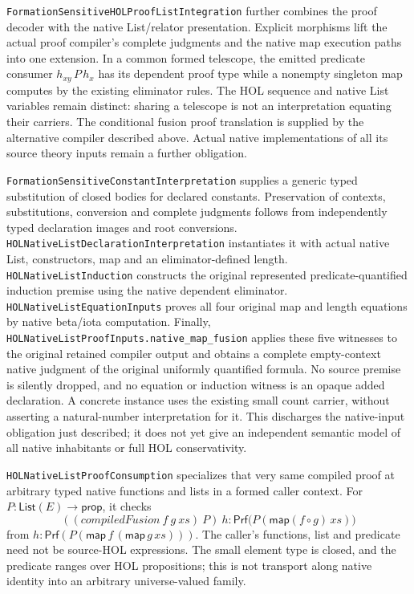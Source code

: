 \documentclass[11pt]{article}
\theoremstyle{definition}
\theoremstyle{remark}
\begin{document}
\nolinkurl{FormationSensitiveHOLProofListIntegration} further combines
the proof decoder with the native List/relator presentation. Explicit
morphisms lift the actual proof compiler's complete judgments and the
native map execution paths into one extension. In a common formed
telescope, the emitted predicate consumer \(h_{xy}\,P\,h_x\) has its
dependent proof type while a nonempty singleton map computes by the
existing eliminator rules. The HOL sequence and native List variables
remain distinct: sharing a telescope is not an interpretation equating
their carriers. The conditional fusion proof translation is supplied by the
alternative compiler described above. Actual native implementations of all
its source theory inputs remain a further obligation.

\nolinkurl{FormationSensitiveConstantInterpretation} supplies a generic
typed substitution of closed bodies for declared constants. Preservation of
contexts, substitutions, conversion and complete judgments follows from
independently typed declaration images and root conversions.
\nolinkurl{HOLNativeListDeclarationInterpretation} instantiates it with
actual native List, constructors, map and an eliminator-defined length.
\nolinkurl{HOLNativeListInduction} constructs the original represented
predicate-quantified induction premise using the native dependent eliminator.
\nolinkurl{HOLNativeListEquationInputs} proves all four original map and
length equations by native beta/iota computation. Finally,
\nolinkurl{HOLNativeListProofInputs.native_map_fusion} applies these five
witnesses to the original retained compiler output and obtains a complete
empty-context native judgment of the original uniformly quantified formula.
No source premise is silently dropped, and no equation or induction witness
is an opaque added declaration. A concrete instance uses the existing small
count carrier, without asserting a natural-number interpretation for it.
This discharges the native-input obligation just described; it does not yet
give an independent semantic model of all native inhabitants or full HOL
conservativity.

\nolinkurl{HOLNativeListProofConsumption} specializes that very same
compiled proof at arbitrary typed native functions and lists in a formed
caller context. For \(P:\mathsf{List}(E)\to\mathsf{prop}\), it checks
\[
 ((\mathit{compiledFusion}\ f\ g\ xs)\ P)\ h
 :\mathsf{Prf}\bigl(P(\mathsf{map}(f\circ g)\,xs)\bigr)
\]
from \(h:\mathsf{Prf}(P(\mathsf{map}\,f\,(\mathsf{map}\,g\,xs)))\).
The caller's functions, list and predicate need not be source-HOL expressions.
The small element type is closed, and the predicate ranges over HOL
propositions; this is not transport along native identity into an arbitrary
universe-valued family.
\end{document}
